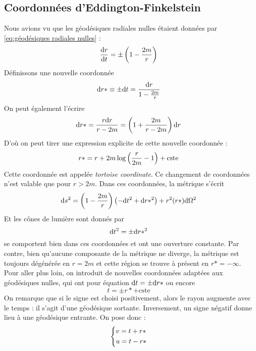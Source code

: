 \subsection{Coordonnées d'Eddington-Finkelstein}
Nous avions vu que les géodésiques radiales nulles étaient données par \ref{eq:géodésiques radiales nulles} :
\begin{equation}
    \frac{\mathrm{d} r}{\mathrm{d} t} = \pm \left( 1 - \frac{2m}{r} \right)
\end{equation}
Définissons une nouvelle coordonnée
\begin{align}
    \mathrm{d} r* \equiv \pm \mathrm{d} t = \frac{\mathrm{d} r}{1 - \frac{2m}{r}}
\end{align}
On peut également l'écrire
\begin{equation}
    \mathrm{d} r* = \frac{r \mathrm{d} r}{r - 2m} = \left( 1 + \frac{2m}{r - 2m} \right) \mathrm{d} r
\end{equation}
D'où on peut tirer une expression explicite de cette nouvelle coordonnée :
\begin{equation}
    r* = r + 2m \log \left( \frac{r}{2m} - 1 \right) + \text{cste}
\end{equation}
Cette coordonnée est appelée \emph{tortoise coordinate}. Ce changement de coordonnées n'est valable que pour $r>2m$. Dans ces coordonnées, la métrique s'écrit
\begin{equation}
    \mathrm{d} s^2 = \left( 1 - \frac{2m}{r}\right) \left( - \mathrm{d} t^2 + \mathrm{d} r*^2 \right) + r^2(r*) \mathrm{d} \Omega^2
\end{equation}
Et les cônes de lumière sont donnés par 
\begin{equation}
    \mathrm{d} t^2 = \pm \mathrm{d} r*^2
\end{equation}
se comportent bien dans ces coordonnées et ont une ouverture constante. Par contre, bien qu'aucune composante de la métrique ne diverge, la métrique est toujours dégénérée en $r=2m$ et cette région se trouve à présent en $r* = -\infty$. \\
Pour aller plus loin, on introduit de nouvelles coordonnées adaptées aux géodésiques nulles, qui ont pour équation $\mathrm{d} t = \pm \mathrm{d} r*$ ou encore
\begin{equation}
    t = \pm r* + \text{cste}
\end{equation}
On remarque que si le signe est choisi positivement, alors le rayon augmente avec le temps : il s'agit d'une géodésique sortante. Inversement, un signe négatif donne lieu à une géodésique entrante. On pose donc :
\begin{equation}
    \begin{dcases}
        v = t + r* \\
        u = t - r*
    \end{dcases}
\end{equation}
